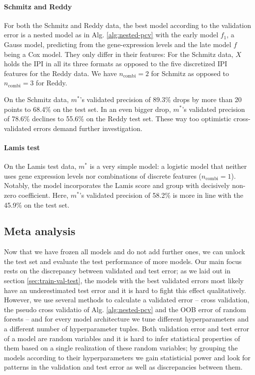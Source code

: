 \paragraph{Schmitz and Reddy}
For both the Schmitz and Reddy data, the best model according to the validation error is a nested 
model as in Alg. \ref{alg:nested-pcv} with the early model $f_1$, a Gauss model, predicting from 
the gene-expression levels and the late model $f$ being a Cox model. They only differ in their 
features: For the Schmitz data, $X$ holds the IPI in all its three formats as opposed to the five 
discretized IPI features for the Reddy data. We have $n_\text{combi} = 2$ for Schmitz as opposed to 
$n_\text{combi} = 3$ for Reddy.

On the Schmitz data, $m^*$'s validated precision of \num{89.3}\% drops by more than \num{20} points 
to \num{68.4}\% on the test set. In an even bigger drop, $m^*$'s validated precision of \num{78.6}\% 
declines to \num{55.6}\% on the Reddy test set. These way too optimistic cross-validated errors 
demand further investigation.

\paragraph{Lamis test}
On the Lamis test data, $m^*$ is a very simple model: a logistic model that neither uses gene 
expression levels nor combinations of discrete features ($n_\text{combi} = 1$). Notably, the model
incorporates the Lamis score and group with decisively non-zero coefficient. Here, $m^*$'s 
validated precision of \num{58.2}\% is more in line with the \num{45.9}\% on the test set.

\subsection{Meta analysis}

Now that we have frozen all models and do not add further ones, we can unlock the test set and 
evaluate the test performance of more models. Our main focus rests on the discrepancy between 
validated and test error; as we laid out in section \ref{sec:train-val-test}, the models with the 
best validated errors most likely have an underestimated test error and it is hard to fight this 
effect qualitatively. However, we use several methods to calculate a validated error -- cross 
validation, the pseudo cross validatio of Alg. \ref{alg:nested-pcv} and the OOB error of random 
forests -- and for every model architecture we tune different hyperparameters and a different 
number of hyperparameter tuples. Both validation error and test error of a model are random 
variables and it is hard to infer statistical properties of them based on a single realization of 
these random variables; by grouping the models according to their hyperparameters we gain 
statisticial power and look for patterns in the validation and test error as well as 
discrepancies between them.

